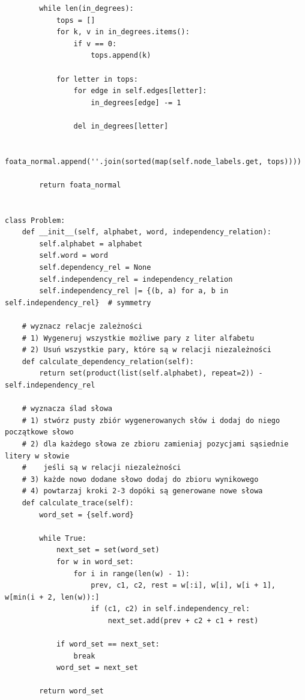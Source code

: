 \documentclass[12pt]{article}
\begin{document}
\begin{verbatim}
        while len(in_degrees):
            tops = []
            for k, v in in_degrees.items():
                if v == 0:
                    tops.append(k)

            for letter in tops:
                for edge in self.edges[letter]:
                    in_degrees[edge] -= 1

                del in_degrees[letter]

            foata_normal.append(''.join(sorted(map(self.node_labels.get, tops))))

        return foata_normal


class Problem:
    def __init__(self, alphabet, word, independency_relation):
        self.alphabet = alphabet
        self.word = word
        self.dependency_rel = None
        self.independency_rel = independency_relation
        self.independency_rel |= {(b, a) for a, b in self.independency_rel}  # symmetry

    # wyznacz relacje zależności
    # 1) Wygeneruj wszystkie możliwe pary z liter alfabetu
    # 2) Usuń wszystkie pary, które są w relacji niezależności
    def calculate_dependency_relation(self):
        return set(product(list(self.alphabet), repeat=2)) - self.independency_rel

    # wyznacza ślad słowa
    # 1) stwórz pusty zbiór wygenerowanych słów i dodaj do niego początkowe słowo
    # 2) dla każdego słowa ze zbioru zamieniaj pozycjami sąsiednie litery w słowie
    #    jeśli są w relacji niezależności
    # 3) każde nowo dodane słowo dodaj do zbioru wynikowego
    # 4) powtarzaj kroki 2-3 dopóki są generowane nowe słowa
    def calculate_trace(self):
        word_set = {self.word}

        while True:
            next_set = set(word_set)
            for w in word_set:
                for i in range(len(w) - 1):
                    prev, c1, c2, rest = w[:i], w[i], w[i + 1], w[min(i + 2, len(w)):]
                    if (c1, c2) in self.independency_rel:
                        next_set.add(prev + c2 + c1 + rest)

            if word_set == next_set:
                break
            word_set = next_set

        return word_set


\end{verbatim}
\end{document}
